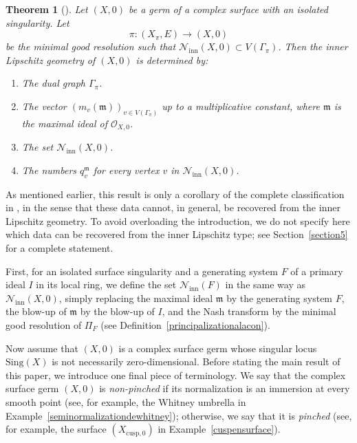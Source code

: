 \documentclass[reqno,dvipsnames,12pt]{amsart}
\newtheorem{thmm}{Theorem}{\Alph{theorem}}
\begin{document}
\begin{thmm}[{\cite[7.5.30]{pichonintroduction}}]\label{classificationBNPPP}
Let $(X,0)$ be a germ of a complex surface with an isolated singularity. Let 
\[
\pi:(X_{\pi},E) \longrightarrow (X,0)
\]
be the minimal good resolution such that $\mathcal{N}_{\mathrm{inn}}(X,0) \subset V(\Gamma_{\pi})$. Then the inner Lipschitz geometry of $(X,0)$  is determined by:
\begin{enumerate}
    \item The dual graph $\Gamma_{\pi}$.
    \item The vector $(m_v(\mathfrak{m}))_{v \in V(\Gamma_{\pi})}$ up to a multiplicative constant, where $\mathfrak{m}$ is the maximal ideal of $\mathcal{O}_{X,0}$.
    \item The set $\mathcal{N}_{\mathrm{inn}}(X,0)$.
    \item The numbers $q_v^{\mathfrak{m}}$ for every vertex $v$ in $\mathcal{N}_{\mathrm{inn}}(X,0)$. 
\end{enumerate}
\end{thmm}
As mentioned earlier, this result is only a corollary of the complete classification in \cite{BNP}, in the sense that these data cannot, in general, be recovered from the inner Lipschitz geometry. To avoid overloading the introduction, we do not specify here which data can be recovered from the inner Lipschitz type; see Section~\ref{section5} for a complete statement.

First, for an isolated surface singularity and a generating system $F$ of a primary ideal $I$ in its local ring, we define the set $\mathcal{N}_{\mathrm{inn}}(F)$ in the same way as $\mathcal{N}_{\mathrm{inn}}(X,0)$, simply replacing the maximal ideal $\mathfrak{m}$ by the generating system $F$, the blow-up of $\mathfrak{m}$ by the blow-up of $I$, and the Nash transform by the minimal good resolution of $\Pi_F$ (see Definition~\ref{principalizationalacon}).

Now assume that $(X,0)$ is a complex surface germ whose singular locus $\mathrm{Sing}(X)$ is not necessarily zero-dimensional. Before stating the main result of this paper, we introduce one final piece of terminology. We say that the complex surface germ $(X,0)$ is \textit{non-pinched} if its normalization is an immersion at every smooth point (see, for example, the Whitney umbrella in Example~\ref{seminormalizationdewhitney}); otherwise, we say that it is \textit{pinched} (see, for example, the surface $(X_{\mathrm{cusp},0})$ in Example~\ref{cuspensurface}).
\end{document}
